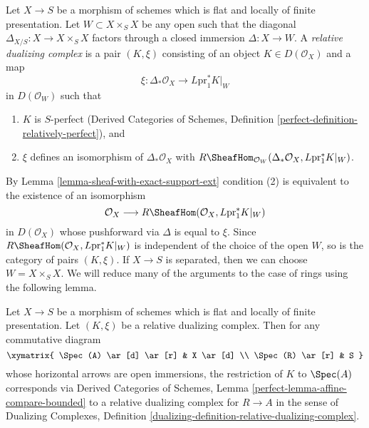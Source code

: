 \begin{definition}
\label{definition-relative-dualizing-complex}
Let $X \to S$ be a morphism of schemes which is flat and
locally of finite presentation. Let $W \subset X \times_S X$
be any open such that the diagonal $\Delta_{X/S} : X \to X \times_S X$
factors through a closed immersion $\Delta : X \to W$.
A {\it relative dualizing complex} is a
pair $(K, \xi)$ consisting of an object $K \in D(\mathcal{O}_X)$
and a map
$$
\xi : \Delta_*\mathcal{O}_X \longrightarrow L\text{pr}_1^*K|_W
$$
in $D(\mathcal{O}_W)$ such that
\begin{enumerate}
\item $K$ is $S$-perfect (Derived Categories of Schemes, Definition
\ref{perfect-definition-relatively-perfect}), and
\item $\xi$ defines an isomorphism of $\Delta_*\mathcal{O}_X$
with
$R\SheafHom_{\mathcal{O}_W}(
\Delta_*\mathcal{O}_X, L\text{pr}_1^*K|_W)$.
\end{enumerate}
\end{definition}

\noindent
By Lemma \ref{lemma-sheaf-with-exact-support-ext} condition (2)
is equivalent to the existence of an isomorphism
$$
\mathcal{O}_X \longrightarrow
R\SheafHom(\mathcal{O}_X, L\text{pr}_1^*K|_W)
$$
in $D(\mathcal{O}_X)$ whose pushforward via $\Delta$ is equal to $\xi$.
Since $R\SheafHom(\mathcal{O}_X, L\text{pr}_1^*K|_W)$ is independent
of the choice of the open $W$, so is the category of pairs $(K, \xi)$.
If $X \to S$ is separated, then we can choose $W = X \times_S X$.
We will reduce many of the arguments to the case of rings
using the following lemma.

\begin{lemma}
\label{lemma-relative-dualizing-complex-algebra}
Let $X \to S$ be a morphism of schemes which is flat and
locally of finite presentation. Let $(K, \xi)$ be a relative
dualizing complex. Then for any commutative diagram
$$
\xymatrix{
\Spec(A) \ar[d] \ar[r] & X \ar[d] \\
\Spec(R) \ar[r] & S
}
$$
whose horizontal arrows are open immersions, the
restriction of $K$ to $\Spec(A)$ corresponds via
Derived Categories of Schemes, Lemma
\ref{perfect-lemma-affine-compare-bounded}
to a relative dualizing complex for $R \to A$
in the sense of Dualizing Complexes, Definition
\ref{dualizing-definition-relative-dualizing-complex}.
\end{lemma}

